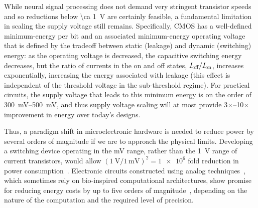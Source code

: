 While neural signal processing does not demand very stringent transistor speeds and so reductions below \SI{\ca 1}{\volt} are certainly feasible, a fundamental limitation in scaling the supply voltage still remains.
Specifically, CMOS has a well-defined minimum-energy per bit and an associated minimum-energy operating voltage that is defined by the tradeoff between static (leakage) and dynamic (switching) energy:
as the operating voltage is decreased, the capacitive switching energy decreases, but the ratio of currents in the on and off states, $I_{\text{\scriptsize off}}/I_{\text{\scriptsize on}}$, increases exponentially, increasing the energy associated with leakage (this effect is independent of the threshold voltage in the sub-threshold regime).
For practical circuits, the supply voltage that leads to this minimum energy is on the order of \SIrange{300}{500}{\milli\volt}, and thus supply voltage scaling will at most provide 3$\times$--10$\times$ improvement in energy over today's designs.

Thus, a paradigm shift in microelectronic hardware is needed to reduce power by several orders of magnitude if we are to approach the physical limits.
Developing a switching device operating in the \si{\milli\volt} range, rather than the \SI{1}{\volt} range of current transistors, would allow $\left(\SI{1}{\volt}/\SI{1}{\milli\volt}\right)^2=\num{1e6}$ fold reduction in power consumption~\cite{yablonovitch08}.
Electronic circuits constructed using analog techniques~\cite{sarpeshkar98}, which sometimes rely on bio-inspired computational architectures, show promise for reducing energy costs by up to five orders of magnitude~\cite{rapoport09,sarpeshkar98,mandal07}, depending on the nature of the computation and the required level of precision.


